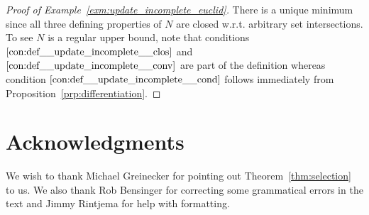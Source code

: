 \documentclass[aop,preprint]{imsart}
\numberwithin{equation}{section}
\theoremstyle{definition}
\theoremstyle{plain}
\begin{document}
\begin{proof}[Proof of Example~\ref{exm:update_incomplete_euclid}]
There is a unique minimum since all three defining properties of $N$ are closed w.r.t. arbitrary set intersections. To see $N$ is a regular upper bound, note that conditions $\ref{con:def__update_incomplete__clos}$ and $\ref{con:def__update_incomplete__conv}$ are part of the definition whereas condition $\ref{con:def__update_incomplete__cond}$ follows immediately from Proposition~\ref{prp:differentiation}.
\end{proof}

\section*{Acknowledgments}

We wish to thank Michael Greinecker for pointing out Theorem~\ref{thm:selection} to us. We also thank Rob Bensinger for correcting some grammatical errors in the text and Jimmy Rintjema for help with formatting.


% 

\end{document}
